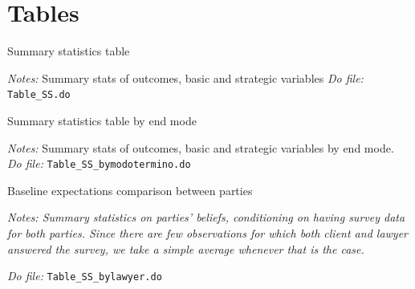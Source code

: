 \documentclass[11pt]{article}
\begin{document}



\pagebreak
\nocite{*}

%
%
\printbibliography



\section{Tables}


\begin{table}[H]
    \caption{Summary statistics table }
    \label{tab:SS}
    \begin{center}
        \tiny{}
    \end{center}
    \footnotesize
    \textit{Notes:} 
Summary stats of outcomes, basic and strategic variables
    \textit{Do file: } \texttt{Table\_SS.do}
\end{table}


\begin{table}[H]
    \caption{Summary statistics table by end mode }
    \label{tab:SS}
    \begin{center}
        \tiny{}
    \end{center}
    \footnotesize
    \textit{Notes:} 
Summary stats of outcomes, basic and strategic variables by end mode.
    \textit{Do file: } \texttt{Table\_SS\_bymodotermino.do}
\end{table}


\begin{table}[H]
    \caption{Baseline expectations comparison between parties}
    \label{Table_expectations_plaintiff_defendant}
    \begin{center}
       \scriptsize{}
    \end{center}
    \footnotesize    
    \textit{Notes: Summary statistics on parties' beliefs, conditioning on having survey data for both parties. Since there are few observations for which both client and lawyer answered the survey, we take a simple average whenever that is the case.} 
    
    \textit{Do file: } \texttt{Table\_SS\_bylawyer.do}
\end{table}

\pagebreak


\end{document}
